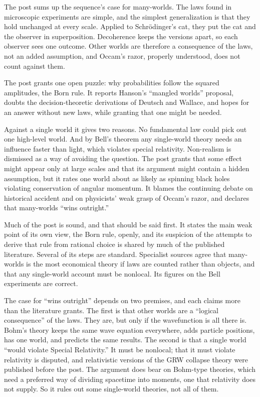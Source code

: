 \begin{afterword}
\summaryhead

The post sums up the sequence's case for many-worlds. The laws found in microscopic experiments are simple, and the simplest generalization is that they hold unchanged at every scale. Applied to Schrödinger's cat, they put the cat and the observer in superposition. Decoherence keeps the versions apart, so each observer sees one outcome. Other worlds are therefore a consequence of the laws, not an added assumption, and Occam's razor, properly understood, does not count against them.

The post grants one open puzzle: why probabilities follow the squared amplitudes, the Born rule. It reports Hanson's ``mangled worlds'' proposal, doubts the decision-theoretic derivations of Deutsch and Wallace, and hopes for an answer without new laws, while granting that one might be needed.

Against a single world it gives two reasons. No fundamental law could pick out one high-level world. And by Bell's theorem any single-world theory needs an influence faster than light, which violates special relativity. Non-realism is dismissed as a way of avoiding the question. The post grants that some effect might appear only at large scales and that its argument might contain a hidden assumption, but it rates one world about as likely as spinning black holes violating conservation of angular momentum. It blames the continuing debate on historical accident and on physicists' weak grasp of Occam's razor, and declares that many-worlds ``wins outright.''

\responsehead

Much of the post is sound, and that should be said first. It states the main weak point of its own view, the Born rule, openly, and its suspicion of the attempts to derive that rule from rational choice is shared by much of the published literature. Several of its steps are standard. Specialist sources agree that many-worlds is the most economical theory if laws are counted rather than objects, and that any single-world account must be nonlocal. Its figures on the Bell experiments are correct.

The case for ``wins outright'' depends on two premises, and each claims more than the literature grants. The first is that other worlds are a ``logical consequence'' of the laws. They are, but only if the wavefunction is all there is. Bohm's theory keeps the same wave equation everywhere, adds particle positions, has one world, and predicts the same results. The second is that a single world ``would violate Special Relativity.'' It must be nonlocal; that it must violate relativity is disputed, and relativistic versions of the GRW collapse theory were published before the post. The argument does bear on Bohm-type theories, which need a preferred way of dividing spacetime into moments, one that relativity does not supply. So it rules out some single-world theories, not all of them.


\end{afterword}
